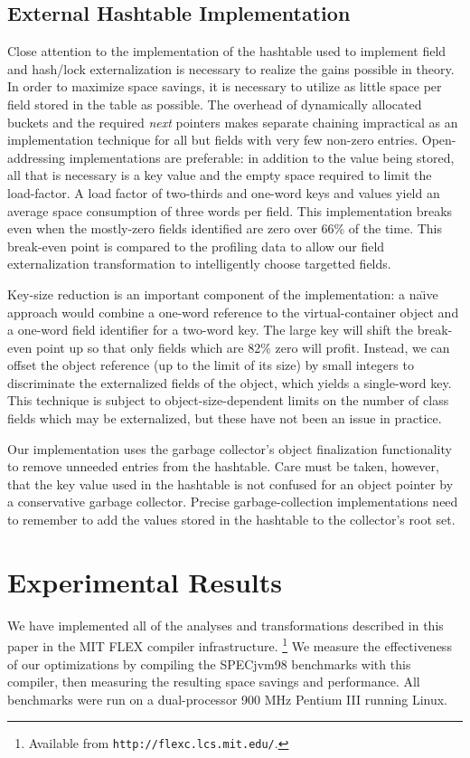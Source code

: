 \documentclass[oribibl]{llncs}
\begin{document}

\subsection{External Hashtable Implementation}
\label{sec:extern-impl}
Close attention to the implementation of the hashtable used to
implement field and hash/lock externalization is
necessary to realize the gains possible in theory.  In order to
maximize space savings, it is necessary to utilize as little space
per field stored in the table as possible.  The overhead of
dynamically allocated buckets and the required {\it next} pointers
makes separate chaining impractical as an implementation technique
for all but fields with very few non-zero entries.  Open-addressing
implementations are preferable: in addition to the value being stored,
all that is necessary is a key value and the empty space required to
limit the load-factor.  A load factor of two-thirds and one-word keys
and values yield an average space consumption of three words per
field.  This implementation breaks even when the mostly-zero fields
identified are zero over 66\% of the time.  This break-even point is
compared to the profiling data to allow our field externalization
transformation to intelligently choose targetted fields.

Key-size reduction is an important component of the implementation:
a na{\"\i}ve approach
would combine a one-word reference to the virtual-container object and a
one-word field identifier for a two-word key.  The large key will
shift the break-even point up so that only fields which are 82\% zero
will profit.  Instead, we can offset the
object reference (up to the limit of its size) by small integers
to discriminate the externalized fields of the object, which yields
a single-word key.  This technique is
subject to object-size-dependent limits on the number
of class fields which may be externalized, but these have not been an
issue in practice.

Our implementation uses the garbage collector's object finalization
functionality to remove unneeded entries from the hashtable.  Care
must be taken, however, that the key value used in the hashtable
is not confused for an object pointer by a conservative garbage
collector.  Precise garbage-collection implementations need to
remember to add the values stored in the hashtable to the
collector's root set.
%
\section{Experimental Results}
\label{sec:results}
%
We have implemented all of the analyses and transformations described
in this paper in the MIT FLEX compiler infrastructure.%
\footnote{Available from {\tt http://flexc.lcs.mit.edu/}.} 
We measure the effectiveness
of our optimizations by compiling the SPECjvm98 benchmarks with 
this compiler, then measuring the resulting space savings and
performance.   All benchmarks were run on a dual-processor 900 MHz
Pentium III running Linux.
%
\end{document}
